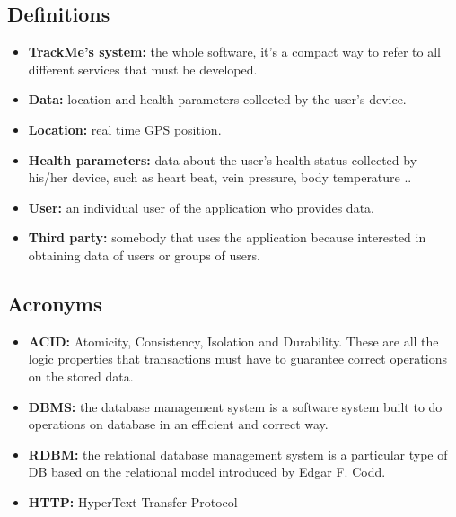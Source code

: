 \subsection{Definitions}
\begin{itemize}
	\item{\textbf{TrackMe's system:} the whole software, it's a compact way to refer to all different services that must be developed.}
	
	\item {\textbf{Data:} location and health parameters collected by the user's device.}
	\item {\textbf{Location:} real time GPS position.}
	\item {\textbf{Health parameters:} data about the user's health status collected by his/her device, such as heart beat, 	vein pressure, body temperature ..}

	\item {\textbf{User:} an individual user of the application who provides data.}
	\item {\textbf{Third party:} somebody that uses the application because interested in obtaining data of users or groups of users.}
\end{itemize}

\subsection{Acronyms} 
\begin{itemize}
	\item \textbf{ACID:} Atomicity, Consistency, Isolation and Durability. These are all the logic properties that transactions must 			have to guarantee correct operations on the stored data.
	\item \textbf{DBMS:} the database management system is a software system built to do operations on database in an efficient 		and correct way.
	\item \textbf{RDBM:} the relational database management system is a particular type of DB based on the relational model 			introduced by Edgar F. Codd.
	\item \textbf{HTTP:} HyperText Transfer Protocol
\end{itemize}

